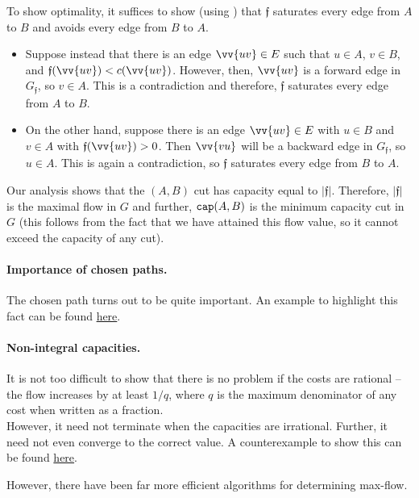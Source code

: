 	To show optimality, it suffices to show (using ) that $\mathfrak{f}$ saturates every edge from $A$ to $B$ and avoids every edge from $B$ to $A$.
	\begin{itemize}
		\item Suppose instead that there is an edge $\vv{uv}\in E$ such that $u\in A$, $v\in B$, and $\mathfrak{f}(\vv{uv}) < c(\vv{uv})$. However, then, $\vv{uv}$ is a forward edge in $G_\mathfrak{f}$, so $v\in A$. This is a contradiction and therefore, $\mathfrak{f}$ saturates every edge from $A$ to $B$.
		\item On the other hand, suppose there is an edge $\vv{uv}\in E$ with $u\in B$ and $v\in A$ with $\mathfrak{f}(\vv{uv})>0$. Then $\vv{vu}$ will be a backward edge in $G_\mathfrak{f}$, so $u\in A$. This is again a contradiction, so $\mathfrak{f}$ saturates every edge from $B$ to $A$.
	\end{itemize}

	Our analysis shows that the $(A,B)$ cut has capacity equal to $|\mathfrak{f}|$. Therefore, $|\mathfrak{f}|$ is the maximal flow in $G$ and further, $\texttt{cap}(A,B)$ is the minimum capacity cut in $G$ (this follows from the fact that we have attained this flow value, so it cannot exceed the capacity of any cut).

	\paragraph{Importance of chosen paths.} The chosen path turns out to be quite important. An example to highlight this fact can be found \href{https://en.wikipedia.org/wiki/Ford%E2%80%93Fulkerson_algorithm#Integral_example}{here}.

	\paragraph{Non-integral capacities.} It is not too difficult to show that there is no problem if the costs are rational -- the flow increases by at least $1/q$, where $q$ is the maximum denominator of any cost when written as a fraction.\\
	However, it need not terminate when the capacities are irrational. Further, it need not even converge to the correct value. A counterexample to show this can be found \href{https://en.wikipedia.org/wiki/Ford%E2%80%93Fulkerson_algorithm#Non-terminating_example}{here}.

	However, there have been far more efficient algorithms for determining max-flow.

